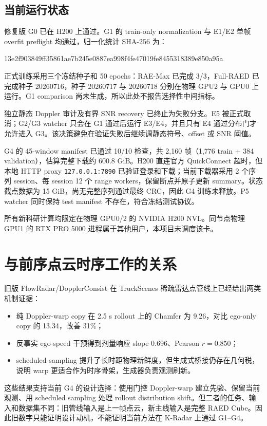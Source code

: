 \documentclass[11pt,a4paper,fontset=none]{ctexart}
\newcommand{\code}[1]{\texttt{#1}}
\newcommand{\hash}[2]{{\small\ttfamily #1\allowbreak{}#2}}
\begin{document}
\subsection{当前运行状态}

修复版 G0 已在 H200 上通过。G1 的 train-only normalization 与 E1/E2 单帧 overfit preflight 均通过，归一化统计 SHA-256 为：
\begin{center}
\hash{13e2f903849ff35861ae7b245e0887ea}{998f4fe47019fe8455318389e850a95a}
\end{center}
正式训练采用三个冻结种子和 50 epochs：RAE-Max 已完成 3/3，Full-RAED 已完成种子 20260716，种子 20260717 与 20260718 分别在物理 GPU2 与 GPU0 上运行。G1 comparison 尚未生成，所以此处不报告选择性中间指标。

独立静态 Doppler 审计及有界 SNR recovery 已终止为失败分支。E5 被正式取消；G2/G3 watcher 只会在 G1 通过后运行 E3/E4，并且只有 E4 通过分布门才允许进入 G3。该决策避免在验证失败后继续调静态符号、offset 或 SNR 阈值。

G4 的 45-window manifest 已通过 10/10 检查，共 2,160 帧（1,776 train + 384 validation），估算完整下载约 600.8 GiB。H200 直连官方 QuickConnect 超时，但本地 HTTP proxy \code{127.0.0.1:7890} 已验证登录和下载；当前下载器采用 2 个序列 session、每 session 12 个 range workers，保留断点并原子更新 summary。状态截点数据为 15 GiB，尚无完整序列通过最终 CRC，因此 G4 训练未释放。P5 watcher 同时保持 test manifest 不存在，符合冻结测试协议。

所有新科研计算均限定在物理 GPU0/2 的 NVIDIA H200 NVL。同节点物理 GPU1 的 RTX PRO 5000 进程属于其他用户，本项目未调度该卡。

\section{与前序点云时序工作的关系}

旧版 FlowRadar/DopplerConsist 在 TruckScenes 稀疏雷达点管线上已经给出两类机制证据：
\begin{itemize}
  \item 纯 Doppler-warp copy 在 2.5 s rollout 上的 Chamfer 为 9.26，对比 ego-only copy 的 13.34，改善 31\%；
  \item 反事实 ego-speed 干预得到剂量响应 slope 0.696、Pearson $r=0.850$；
  \item scheduled sampling 提升了长时距物理新鲜度，但生成式桥接仍存在几何税，说明 warp 更适合作为时序骨架，生成器负责观测刷新。
\end{itemize}

这些结果支持当前 G4 的设计选择：使用门控 Doppler-warp 建立先验、保留当前观测、用 scheduled sampling 处理 rollout distribution shift。但二者的任务、输入和数据集不同：旧管线输入是上一帧点云，新主线输入是完整 RAED Cube。因此旧数字只能证明设计动机，不能证明当前方法在 K-Radar 上通过 G1--G4。
\end{document}
